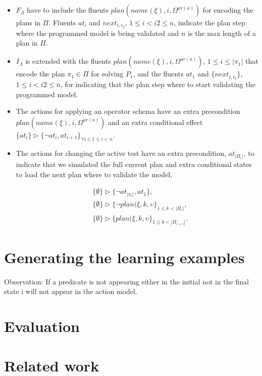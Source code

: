 \documentclass[letterpaper]{article} %
\begin{document}
\begin{itemize}
\item $F_{\Lambda}$ have to include the fluents $plan(name(\xi),i,\Omega^{ar(a)})$ for encoding the plans in $\Pi$. Fluents $at_i$ and $next_{i,i_2}$, {\small $1\leq i<i2\leq n$}, indicate the plan step where the programmed model is being validated and $n$ is the max length of a plan in $\Pi$.
\item $I_{\Lambda}$ is extended with the fluents $plan(name(\xi),i,\Omega^{ar(a)})$, {\small $1\leq i\leq |\pi_1|$} that encode the plan $\pi_1\in \Pi$ for solving $P_1$, and the fluents $at_1$ and $\{next_{i,i_2}\}$, {\small $1\leq i<i2\leq n$}, for indicating that the plan step where to start validating the programmed model.
\item The actions for applying an operator schema have an extra precondition $plan(name(\xi),i,\Omega^{ar(a)})$ and an extra conditional effect $\{at_{i}\}\rhd\{\neg at_{i},at_{i+1}\}_{\forall i\in 1\leq i< n}$.
\item The actions for changing the active test have an extra precondition, $at_{|\Pi_i|}$, to indicate that we simulated the full current plan and extra conditional states to load the next plan where to validate the model,
\begin{small}
\begin{align*}
&\{\emptyset\}\rhd\{\neg at_{|\pi_i|},at_1\},\\
&\{\emptyset\}\rhd\{\neg plan(\xi,k,\upsilon\}_{1\leq k<|\Pi_i|},\\
&\{\emptyset\}\rhd\{plan(\xi,k,\upsilon\}_{1\leq k<|\Pi_{i+1}|}.
\end{align*}
\end{small}
\end{itemize}



\section{Generating the learning examples}
Observation: If a predicate is not appearing either in the initial not in the final state i will not appear in the action model. 


\section{Evaluation}

\section{Related work}
\end{document}
